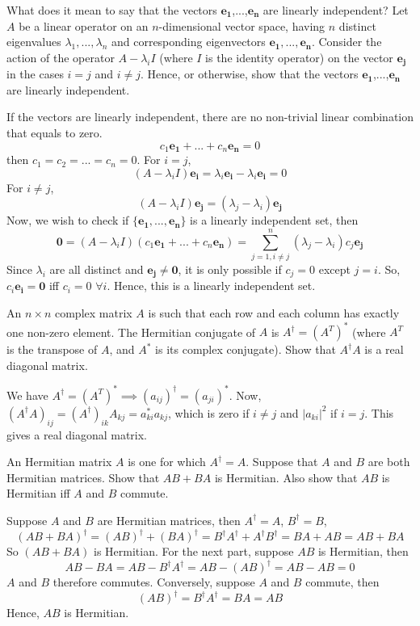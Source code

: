 \documentclass[a4paper]{article}
\begin{document}
\begin{qns}
What does it mean to say that the vectors $\mathbf{e_1}$,...,$\mathbf{e_n}$ are linearly independent? Let $A$ be a linear operator on an $n$-dimensional vector space, having $n$ distinct
eigenvalues $\lambda_1,...,\lambda_n$ and corresponding eigenvectors $\mathbf{e_1},...,\mathbf{e_n}$. Consider
the action of the operator $A-\lambda_iI$ (where $I$ is the identity operator) on the vector $\mathbf{e_j}$ in the cases $i = j$ and $i\neq j$. Hence, or otherwise, show that the vectors $\mathbf{e_1}$,...,$\mathbf{e_n}$ are linearly independent.
\end{qns}
\begin{ans}
If the vectors are linearly independent, there are no non-trivial linear combination that equals to zero.
$$c_1\mathbf{e_1}+...+c_n\mathbf{e_n}=0$$
then $c_1=c_2=...=c_n=0$. For $i=j$, 
$$(A-\lambda_i I)\mathbf{e_i}=\lambda_i\mathbf{e_i}-\lambda_i\mathbf{e_i}=0$$
For $i\neq j$,
$$(A-\lambda_i I)\mathbf{e_j}=(\lambda_j-\lambda_i)\mathbf{e_j}$$
Now, we wish to check if $\{\mathbf{e_1},...,\mathbf{e_n}\}$ is a linearly independent set, then
$$\boldsymbol{0}=(A-\lambda_i I)(c_1\mathbf{e_1}+...+c_n\mathbf{e_n})=\sum_{j=1,i\neq j}^n(\lambda_j-\lambda_i)c_j\mathbf{e_j}$$
Since $\lambda_i$ are all distinct and $\mathbf{e_j}\neq\boldsymbol{0}$, it is only possible if $c_j=0$ except $j=i$. So, $c_i\mathbf{e_i}=\boldsymbol{0}$ iff $c_i=0$ $\forall i$. Hence, this is a linearly independent set.
\end{ans}
\begin{qns}[Hermitian]
An $n\times n$ complex matrix $A$ is such that each row and each column has exactly one non-zero element. The Hermitian conjugate of $A$ is $A^\dag=(A^T)^*$ (where $A^T$ is the transpose of $A$, and $A^*$ is its complex conjugate). Show that $A^\dag A$ is a real diagonal matrix.
\end{qns}
\begin{ans}
We have $A^\dag=(A^T)^*\implies(a_{ij})^\dag=(a_{ji})^*$. Now, $(A^\dag A)_{ij}=(A^\dag)_{ik}A_{kj}=a_{ki}^*a_{kj}$, which is zero if $i\neq j$ and $|a_{ki}|^2$ if $i=j$. This gives a real diagonal matrix.
\end{ans}
\begin{qns}[Hermitian]
An Hermitian matrix $A$ is one for which $A^\dag=A$. Suppose that $A$ and $B$ are both Hermitian matrices. Show that $AB + BA$ is Hermitian. Also show that $AB$ is Hermitian iff $A$ and $B$ commute.
\end{qns}
\begin{ans}
Suppose $A$ and $B$ are Hermitian matrices, then $A^\dag=A$, $B^\dag=B$,
$$(AB+BA)^\dag=(AB)^\dag+(BA)^\dag=B^\dag A^\dag+A^\dag B^\dag=BA+AB=AB+BA$$
So $(AB+BA)$ is Hermitian. For the next part, suppose $AB$ is Hermitian, then
$$AB-BA=AB-B^\dag A^\dag=AB-(AB)^\dag=AB-AB=0$$
$A$ and $B$ therefore commutes. Conversely, suppose $A$ and $B$ commute, then
$$(AB)^\dag=B^\dag A^\dag=BA=AB$$
Hence, $AB$ is Hermitian.
\end{ans}
\end{document}

